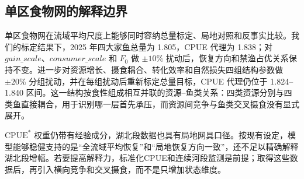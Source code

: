 \subsection{单区食物网的解释边界}
单区食物网在流域平均尺度上能够同时容纳总量标定、局地对照和反事实比较。我们的标定结果下，2025 年四大家鱼总量为 1.805，CPUE 代理为 1.838；对 $gain\_scale$、$consumer\_scale$ 和 $F_0$ 做 $\pm10\%$ 扰动后，恢复方向和禁渔占优关系保持不变。进一步对资源增长、摄食耦合、转化效率和自然损失四组结构参数做 $\pm20\%$ 分组扰动，并在每组扰动后重新标定总量目标，CPUE 代理仍位于 1.824--1.840 区间。这一结构按食性组成相互并联的资源--鱼类关系：四类资源分别与四类鱼直接耦合，用于识别哪一层首先承压，而资源间竞争与鱼类交叉摄食没有显式展开。

$\mathrm{CPUE}^*$ 权重仍带有经验成分，湖北段数据也具有局地网具口径。按现有设定，模型能够稳健支持的是“全流域平均恢复”和“局地恢复方向一致”，还不足以精确解释湖北段增幅。若要提高解释力，标准化CPUE和连续河段监测是前提；取得这些数据后，再引入横向竞争和交叉摄食，而不是只增加状态维度。


